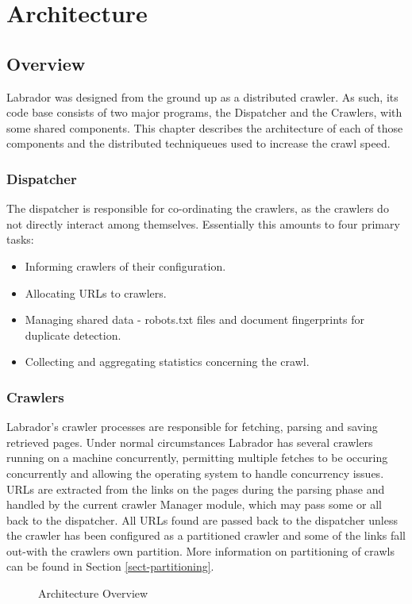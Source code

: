 \chapter{Architecture}\label{chp-arch}
\section{Overview}
Labrador was designed from the ground up as a distributed crawler. As such, its code base consists of two major programs, the Dispatcher and the Crawlers, with some shared components. This chapter describes the architecture of each of those components and the distributed techniqueues used to increase the crawl speed.
\subsection{Dispatcher}
The dispatcher is responsible for co-ordinating the crawlers, as the crawlers do not directly interact among themselves. Essentially this amounts to four primary tasks:
\begin{itemize}
\item{Informing crawlers of their configuration.}
\item{Allocating URLs to crawlers.}
\item{Managing shared data - robots.txt files and document fingerprints for duplicate detection.}
\item{Collecting and aggregating statistics concerning the crawl.}
\end{itemize}

\subsection{Crawlers}
Labrador's crawler processes are responsible for fetching, parsing and saving retrieved pages. Under normal circumstances Labrador has several crawlers running on a machine concurrently, permitting multiple fetches to be occuring concurrently and allowing the operating system to handle concurrency issues. URLs are extracted from the links on the pages during the parsing phase and handled by the current crawler Manager module, which may pass some or all back to the dispatcher. All URLs found are passed back to the dispatcher unless the crawler has been configured as a partitioned crawler and some of the links fall out-with the crawlers own partition. More information on partitioning of crawls can be found in Section \ref{sect-partitioning}.

\begin{figure}[h]
  \centerline{
  }
  \caption{Architecture Overview}
  \label{fig-architecture}
\end{figure}

